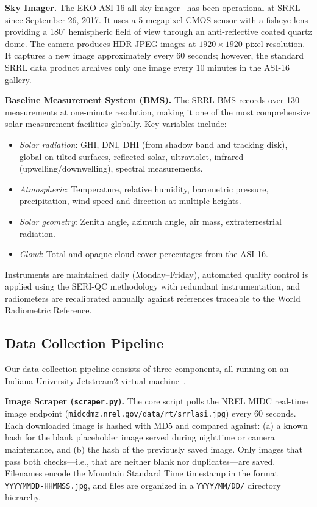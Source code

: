 \documentclass[twoside,11pt]{article}
\begin{document}
\textbf{Sky Imager.} The EKO ASI-16 all-sky imager~\citep{nrel_asi16} has been operational at SRRL since September 26, 2017. It uses a 5-megapixel CMOS sensor with a fisheye lens providing a 180$^\circ$ hemispheric field of view through an anti-reflective coated quartz dome. The camera produces HDR JPEG images at $1920 \times 1920$ pixel resolution. It captures a new image approximately every 60 seconds; however, the standard SRRL data product archives only one image every 10 minutes in the ASI-16 gallery.

\textbf{Baseline Measurement System (BMS).} The SRRL BMS records over 130 measurements at one-minute resolution, making it one of the most comprehensive solar measurement facilities globally. Key variables include:
\begin{itemize}
    \item \textit{Solar radiation}: GHI, DNI, DHI (from shadow band and tracking disk), global on tilted surfaces, reflected solar, ultraviolet, infrared (upwelling/downwelling), spectral measurements.
    \item \textit{Atmospheric}: Temperature, relative humidity, barometric pressure, precipitation, wind speed and direction at multiple heights.
    \item \textit{Solar geometry}: Zenith angle, azimuth angle, air mass, extraterrestrial radiation.
    \item \textit{Cloud}: Total and opaque cloud cover percentages from the ASI-16.
\end{itemize}
Instruments are maintained daily (Monday--Friday), automated quality control is applied using the SERI-QC methodology with redundant instrumentation, and radiometers are recalibrated annually against references traceable to the World Radiometric Reference.

\subsection{Data Collection Pipeline}

Our data collection pipeline consists of three components, all running on an Indiana University Jetstream2 virtual machine~\citep{hancock2021jetstream2}.

\textbf{Image Scraper (\texttt{scraper.py}).} The core script polls the NREL MIDC real-time image endpoint (\texttt{midcdmz.nrel.gov/data/rt/srrlasi.jpg}) every 60 seconds. Each downloaded image is hashed with MD5 and compared against: (a) a known hash for the blank placeholder image served during nighttime or camera maintenance, and (b) the hash of the previously saved image. Only images that pass both checks---i.e., that are neither blank nor duplicates---are saved. Filenames encode the Mountain Standard Time timestamp in the format \texttt{YYYYMMDD-HHMMSS.jpg}, and files are organized in a \texttt{YYYY/MM/DD/} directory hierarchy.
\end{document}
